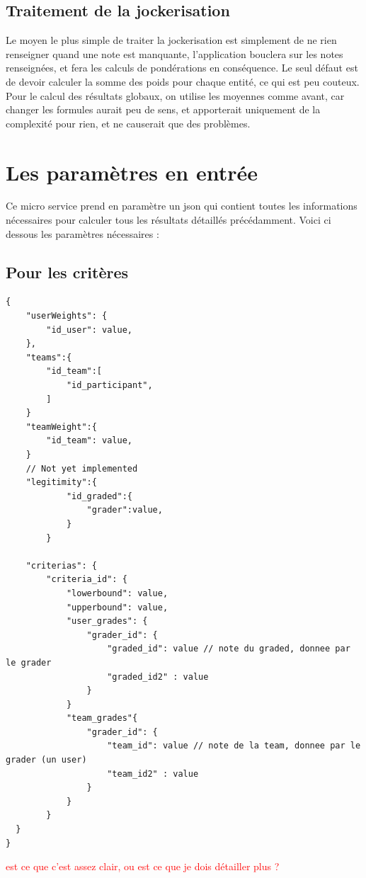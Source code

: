 \documentclass[colorised, sobre]{template} %
\begin{document}
    \subsection{Traitement de la jockerisation}
    Le moyen le plus simple de  traiter la jockerisation est simplement de ne rien renseigner quand une note est manquante, l'application bouclera sur les notes renseignées, et fera les calculs de pondérations en conséquence. Le seul défaut est de devoir calculer la somme des poids pour chaque entité, ce qui est peu couteux. Pour le calcul des résultats globaux, on utilise les moyennes comme avant, car changer les formules aurait peu de sens, et apporterait uniquement de la complexité pour rien, et ne causerait que des problèmes.
    
    
    
    
\section{Les paramètres en entrée}
    Ce micro service prend en paramètre un json qui contient toutes les informations nécessaires pour calculer tous les résultats détaillés précédamment. Voici ci dessous les paramètres nécessaires : 
    \subsection{Pour les critères}
        \begin{lstlisting}
{
    "userWeights": {
        "id_user": value,
    },
    "teams":{
        "id_team":[
            "id_participant",
        ]
    }
    "teamWeight":{
        "id_team": value, 
    }
    // Not yet implemented
    "legitimity":{
            "id_graded":{
                "grader":value,
            }
        }

    "criterias": {
        "criteria_id": {
            "lowerbound": value,
            "upperbound": value,
            "user_grades": {
                "grader_id": {
                    "graded_id": value // note du graded, donnee par le grader
                    "graded_id2" : value
                }
            }
            "team_grades"{
                "grader_id": {
                    "team_id": value // note de la team, donnee par le grader (un user)
                    "team_id2" : value
                }
            }
        }
  }
}
        \end{lstlisting}
    \textcolor{red}{est ce que c'est assez clair, ou est ce que je dois détailler plus ?}
    \newpage
\end{document}
